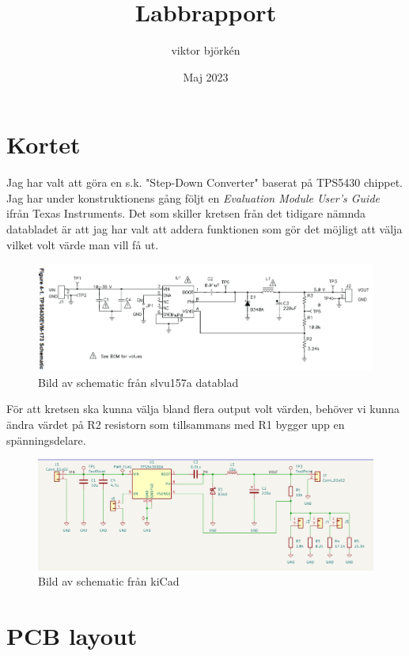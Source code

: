 \documentclass{article}
\title{Labbrapport}
\author{viktor björkén }
\date{Maj 2023}
\begin{document}
\maketitle

\section{Kortet}

Jag har valt att göra en s.k. "Step-Down Converter" baserat på TPS5430 chippet.
Jag har under konstruktionens gång följt en \textit{Evaluation Module User's
Guide} ifrån Texas Instruments. Det som skiller kretsen från det tidigare
nämnda databladet är att jag har valt att addera funktionen som gör det möjligt
att välja vilket volt värde man vill få ut. 

\begin{figure}[htp]
    \centering
    \includegraphics[width=15cm]{img/nyschema.png}
    \caption{Bild av schematic från slvu157a datablad}
\end{figure}

För att kretsen ska kunna välja bland flera output volt värden, behöver vi
kunna ändra värdet på R2 resistorn som tillsammans med R1 bygger upp en
spänningsdelare.

\begin{figure}[htp]
    \centering
    \includegraphics[width=15cm]{img/schemalab.png}
    \caption{Bild av schematic från kiCad}
\end{figure}


\section{PCB layout}
\end{document}
